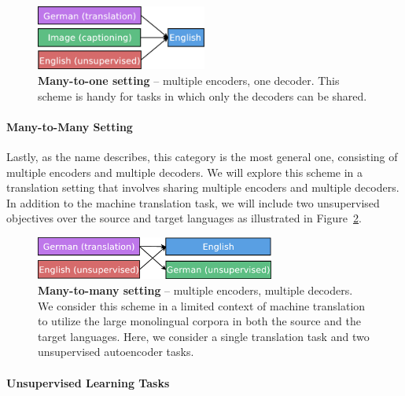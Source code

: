 \begin{figure}[tbh]
\centering
\includegraphics[width=0.5\textwidth, clip=true, trim= 0 0 0
0]{img/6-1_mto}
\caption{{\bf Many-to-one setting} -- multiple encoders, one decoder. This scheme
is handy for tasks in which only the decoders can be shared.}
\label{f:mto}
\end{figure}

\paragraph{Many-to-Many Setting}
Lastly, as the name describes, this category is the most general one,
consisting of multiple encoders and multiple decoders.
We will explore this scheme in a translation setting that involves sharing multiple
encoders and multiple decoders.  In addition to the machine
translation task, we will include two unsupervised 
objectives over the source and target languages as illustrated in
Figure~\ref{f:mtm}.

\begin{figure}[tbh]
\centering
\includegraphics[width=0.7\textwidth, clip=true, trim= 0 0 0
0]{img/6-1_mtm}
\caption{{\bf Many-to-many setting} -- multiple encoders, multiple decoders. We
consider this scheme in a limited context of machine translation to utilize the large
monolingual corpora in both the source and the target languages. Here, we
consider a single translation task and two unsupervised autoencoder tasks.} 
\label{f:mtm}
\end{figure}

\paragraph{Unsupervised Learning Tasks}


